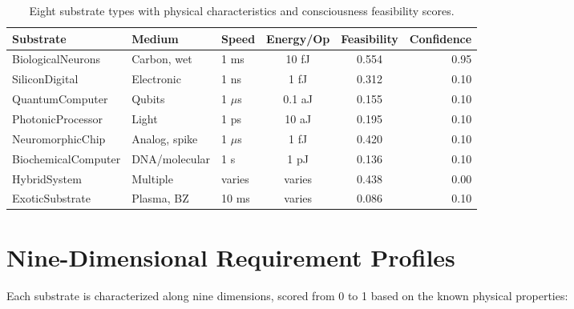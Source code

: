 \documentclass[12pt]{book}
\begin{document}
\begin{table}[H]
\centering
\caption{Eight substrate types with physical characteristics and consciousness feasibility scores.}
\label{tab:substrates}
\begin{tabular}{lllccr}
\toprule
\textbf{Substrate} & \textbf{Medium} & \textbf{Speed} & \textbf{Energy/Op} & \textbf{Feasibility} & \textbf{Confidence} \\
\midrule
BiologicalNeurons & Carbon, wet & 1 ms & 10 fJ & 0.554 & 0.95 \\
SiliconDigital & Electronic & 1 ns & 1 fJ & 0.312 & 0.10 \\
QuantumComputer & Qubits & 1 $\mu$s & 0.1 aJ & 0.155 & 0.10 \\
PhotonicProcessor & Light & 1 ps & 10 aJ & 0.195 & 0.10 \\
NeuromorphicChip & Analog, spike & 1 $\mu$s & 1 fJ & 0.420 & 0.10 \\
BiochemicalComputer & DNA/molecular & 1 s & 1 pJ & 0.136 & 0.10 \\
HybridSystem & Multiple & varies & varies & 0.438 & 0.00 \\
ExoticSubstrate & Plasma, BZ & 10 ms & varies & 0.086 & 0.10 \\
\bottomrule
\end{tabular}
\end{table}

\section{Nine-Dimensional Requirement Profiles}

Each substrate is characterized along nine dimensions, scored from 0 to 1 based on the known physical properties:
\end{document}
